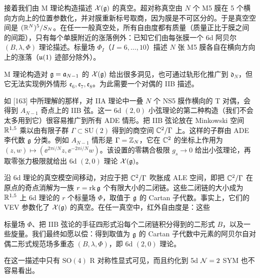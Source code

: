 接着我们由 M 理论构造描述 $\mathcal{X}(\mathfrak{g})$ 的真空。超对称真空由 $N$ 个 M5 膜在 5 个横向方向上的位置参数化，并对膜重新标号取商，因为膜是不可区分的。于是真空空间是 $(\mathbb{R}^N)^5/S_N$。在任一一般真空处，所有自由度都有质量（质量正比于膜之间的间距），只有每个单膜附近的涨落例外：已知它们由每张膜一个 6d 阿贝尔 $(B,\lambda,\Phi)$ 理论描述。标量场 $\Phi_I$（$I=6,\dots,10$）描述 $N$ 张 M5 膜各自在横向方向上的涨落（$\mathfrak{u}(1)$ 迹部分除外）。

M 理论构造对 $\mathfrak{g}=\mathfrak{a}_{N-1}$ 的 $\mathcal{X}(\mathfrak{g})$ 给出很多洞见，也可通过轨形化推广到 $\mathfrak{d}_N$，但它无法实现例外情形 $\mathfrak{e}_6,\mathfrak{e}_7,\mathfrak{e}_8$。为此需要一个对偶的 IIB 描述。

如 [163] 中所理解的那样，对 IIA 理论中一叠 $N$ 个 NS5 膜作横向的 T 对偶，会得到 $A_{N-1}$ 奇点上的 IIB 弦。这一 6d $(2,0)$ 小弦理论的第二种构造（我们不会太多用到它）很容易推广到所有 ADE 情形。把 IIB 弦论放在 Minkowski 空间 $\mathbb{R}^{1,5}$ 乘以由有限子群 $\Gamma\subset\mathrm{SU}(2)$ 得到的商空间 $\mathbb{C}^2/\Gamma$ 上。这样的子群由 ADE 李代数 $\mathfrak{g}$ 分类。例如 $A_{N-1}$ 情形是 $\Gamma=\mathbb{Z}_N$，它在 $\mathbb{C}^2$ 的坐标上作用为 $(z,w)\mapsto(\ee^{2\pi i/N}z,\ee^{-2\pi i/N}w)$。该设置的零耦合极限 $g_s\to 0$ 给出小弦理论，再取零张力极限就给出 6d $(2,0)$ 理论 $\mathcal{X}(\mathfrak{g})$。

沿 6d 理论的真空模空间移动，对应于把 $\mathbb{C}^2/\Gamma$ 吹胀成 ALE 空间，即把 $\mathbb{C}^2/\Gamma$ 在原点的奇点消解为一族 $r=\operatorname{rk}\mathfrak{g}$ 个有限大小的二闭链。这些二闭链的大小成为 $\mathbb{R}^{1,5}$ 上 6d 理论的 $r$ 个标量场 $\Phi$，取值于 $\mathfrak{g}$ 的 Cartan 子代数。事实上，它们的 VEV 参数化了 $\mathcal{X}(\mathfrak{g})$ 的真空。在任一真空中，红外自由度是：这些

标量场 $\Phi$、把 IIB 弦论的手征四形式沿每个二闭链积分得到的二形式 $B$，以及一些旋量。我们最终如愿以偿：得到取值为 $\mathfrak{g}$ 的 Cartan 子代数中元素的阿贝尔自对偶二形式规范场多重态 $(B,\lambda,\Phi)$，即 6d $(2,0)$ 理论。

在这一描述中只有 $\mathrm{SO}(4)$ R 对称性显式可见，而且约化到 5d $\mathcal{N}=2$ SYM 也不容易看出。


